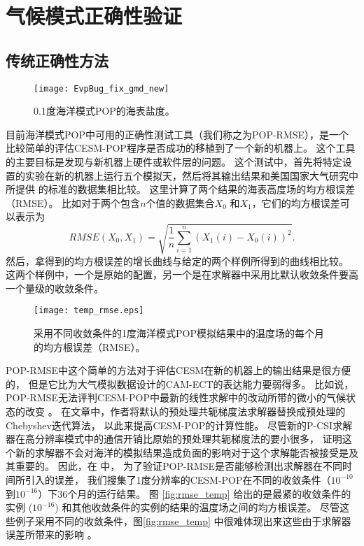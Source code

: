 \section{气候模式正确性验证}
\label{verify:ocean}

\subsection{传统正确性方法}
\label{verify:premethod}
\begin{figure}%
\centering
\texttt{[image: EvpBug\_fix\_gmd\_new]}
\caption[] {0.1度海洋模式POP的海表盐度。 \label{fig:sst}}
\end{figure}

目前海洋模式POP中可用的正确性测试工具（我们称之为POP-RMSE），是一个比较简单的评估CESM-POP程序是否成功的移植到了一个新的机器上。 
这个工具的主要目标是发现与新机器上硬件或软件层的问题。 
这个测试中，首先将特定设置的实验在新的机器上运行五个模拟天，然后将其输出结果和美国国家大气研究中所提供 的标准的数据集相比较。
这里计算了两个结果的海表高度场的均方根误差（RMSE）。 比如对于两个包含$n$个值的数据集合$X_0$ 和$X_1$，它们的均方根误差可以表示为
 \begin{equation*}
 RMSE(X_0, X_1) = \sqrt{\frac{1}{n}\sum_{i=1}^n(X_1(i)-X_0(i))^2}.
 \end{equation*}
然后，拿得到的均方根误差的增长曲线与给定的两个样例所得到的曲线相比较。 
这两个样例中，一个是原始的配置，另一个是在求解器中采用比默认收敛条件要高一个量级的收敛条件。 


\begin{figure}%
\begin{center}
\texttt{[image: temp\_rmse.eps]}
\end{center}
\caption[] {采用不同收敛条件的1度海洋模式POP模拟结果中的温度场的每个月的均方根误差（RMSE）。}
\label{fig:ssh_rmse_t}
\end{figure}

POP-RMSE中这个简单的方法对于评估CESM在新的机器上的输出结果是很方便的， 但是它比为大气模拟数据设计的CAM-ECT的表达能力要弱得多。 
比如说，POP-RMSE无法评判CESM-POP中最新的线性求解中的改动所带的微小的气候状态的改变 \cite{yong2015}。 
在文章\cite{yong2015}中，作者将默认的预处理共轭梯度法求解器替换成预处理的Chebyshev迭代算法， 以此来提高CESM-POP的计算性能。
尽管新的P-CSI求解器在高分辨率模式中的通信开销比原始的预处理共轭梯度法的要小很多， 证明这个新的求解器不会对海洋的模拟结果造成负面的影响对于这个求解能否被接受是及其重要的。 
因此，在 \cite{yong2015}中， 为了验证POP-RMSE是否能够检测出求解器在不同时间所引入的误差， 我们搜集了1度分辨率的CESM-POP在不同的收敛条件（$10^{-10}$ 到$10^{-16}$）下36个月的运行结果。  图   \ref{fig:rmse_temp} 给出的是最紧的收敛条件的实例  ($10^{-16}$) 和其他收敛条件的实例的结果的温度场之间的均方根误差。 
尽管这些例子采用不同的收敛条件，图\ref{fig:rmse_temp} 中很难体现出来这些由于求解器误差所带来的影响  \cite{yong2015}。 

